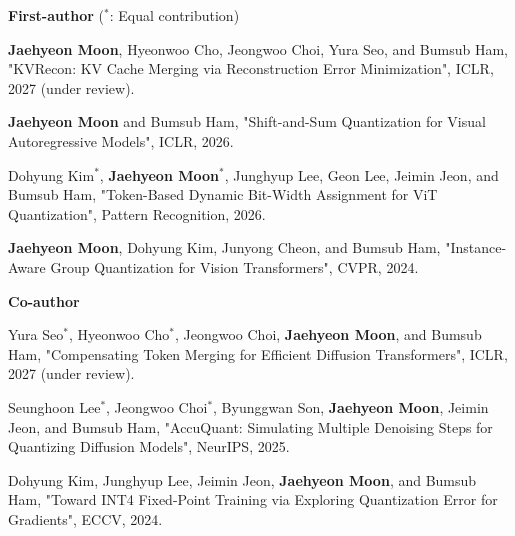 \documentclass[11pt]{article}
\begin{document}
\vspace{6pt}

\textbf{First-author}
\hfill
{\footnotesize\color{Muted}($^*$: Equal contribution)}

\begin{itemize}[left=0pt,itemsep=4pt,topsep=2pt]
  {\color{Muted}\item \textbf{Jaehyeon Moon}, Hyeonwoo Cho, Jeongwoo Choi, Yura Seo, and Bumsub Ham,
  "KVRecon: KV Cache Merging via Reconstruction Error Minimization",
  ICLR, 2027 (under review).}

  \item \textbf{Jaehyeon Moon} and Bumsub Ham,
  "Shift-and-Sum Quantization for Visual Autoregressive Models",
  ICLR, 2026.

  \item Dohyung Kim$^*$, \textbf{Jaehyeon Moon}$^*$,
  Junghyup Lee, Geon Lee, Jeimin Jeon, and Bumsub Ham,
  "Token-Based Dynamic Bit-Width Assignment for ViT Quantization",
  Pattern Recognition, 2026.

  \item \textbf{Jaehyeon Moon}, Dohyung Kim, Junyong Cheon, and Bumsub Ham,
  "Instance-Aware Group Quantization for Vision Transformers",
  CVPR, 2024.

\end{itemize}

\vspace{4pt}

\textbf{Co-author}

\begin{itemize}[left=0pt,itemsep=4pt,topsep=2pt]
  {\color{Muted}\item Yura Seo$^*$, Hyeonwoo Cho$^*$, Jeongwoo Choi, \textbf{Jaehyeon Moon}, and Bumsub Ham,
  "Compensating Token Merging for Efficient Diffusion Transformers",
  ICLR, 2027 (under review).}

  \item Seunghoon Lee$^*$, Jeongwoo Choi$^*$, Byunggwan Son,
  \textbf{Jaehyeon Moon}, Jeimin Jeon, and Bumsub Ham,
  "AccuQuant: Simulating Multiple Denoising Steps for Quantizing Diffusion Models",
  NeurIPS, 2025.

  \item Dohyung Kim, Junghyup Lee, Jeimin Jeon,
  \textbf{Jaehyeon Moon}, and Bumsub Ham,
  "Toward INT4 Fixed-Point Training via Exploring Quantization Error for Gradients",
  ECCV, 2024.

\end{itemize}
\end{document}
